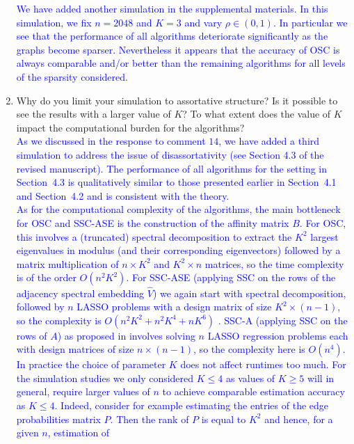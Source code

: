 \documentclass[
]{article}
\begin{document}
\begin{enumerate}
  \textcolor{blue}{
  We have added another simulation in the supplemental materials. 
  In this simulation, we fix $n = 2048$ and $K = 3$ and vary $\rho \in
  (0, 1)$. In particular we see that the performance of all algorithms
  deteriorate significantly as the graphs become sparser. Nevertheless
  it appears that the accuracy of OSC is always comparable and/or better
  than the remaining algorithms for all levels of the sparsity
  considered.
  }
\item
  Why do you limit your simulation to assortative structure? Is it
  possible to see the results with a larger value of \(K\)? To what
  extent does the value of \(K\) impact the computational burden for the
  algorithms?\\
  \textcolor{blue}{
  As we discussed in the response to comment
  $14$, we have added a third simulation to address the issue of disassortativity (see Section
  4.3 of the revised manuscript). The performance of all algorithms
  for the setting in Section~4.3 is qualitatively similar to those
  presented earlier in Section~4.1 and Section~4.2 and is consistent with the theory. 
  }\\
  \textcolor{blue}{
  As for the computational complexity of the algorithms, the main bottleneck for OSC and
  SSC-ASE is the construction of the affinity matrix $B$. 
  For OSC, this involves a (truncated) spectral decomposition to extract the
  $K^2$ largest eigenvalues in modulus (and their corresponding
  eigenvectors) followed by a matrix multiplication of $n \times K^2$
  and $K^2 \times n$ matrices, so the time complexity is of the order $O(n^2 K^2)$. 
  For SSC-ASE (applying SSC on the rows of the adjacency spectral
  embedding $\hat{V}$) we again start with spectral decomposition, followed by
  $n$ LASSO problems with a design matrix of size 
  $K^2 \times (n - 1)$, so the complexity is $O(n^2 K^2 + n^2 K^4 + n K^6)$ \cite{10.1214/009053604000000067}. 
  SSC-A (applying SSC on the rows of $A$) as proposed in \cite{noroozi2019estimation} involves solving $n$ LASSO regression problems each with design matrices of size $n \times (n - 1)$, so the complexity here is $O(n^4)$. 
  In practice the choice of parameter $K$ does not affect
  runtimes too much. For the simulation studies we only considered $K
  \leq 4$ as values of $K \geq 5$ will in general, require larger values of $n$ to achieve 
  comparable estimation accuracy as $K \leq 4$.  Indeed, consider for
  example estimating the entries of the edge probabilities matrix
  $P$. Then the rank of $P$ is equal to $K^2$ and hence, for a given $n$, estimation of
}
\end{enumerate}
\end{document}
